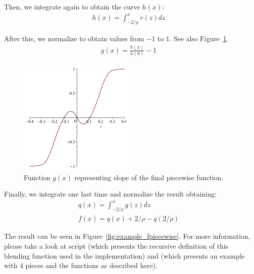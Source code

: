 \documentclass[11pt]{article}
\begin{document}
Then, we integrate again to obtain the curve $h(x)$:
\begin{align*}
  h(x) = \int_{-2/\rho}^{x} r(z) dz
\end{align*}

After this, we normalize to obtain values from $-1$ to $1$. See also Figure~\ref{fig:piecewise_slope}.
\begin{align*}
  g(x) = \frac{h(x)}{h(0)} - 1
\end{align*}

  \begin{figure}[!hbt]
    \begin{center}
      \includegraphics[width=0.5\textwidth]{piecewise_slope}
    \end{center}
    \caption{Function $g(x)$ representing slope of the final piecewise function.}
    \label{fig:piecewise_slope}
  \end{figure}

Finally, we integrate one last time and normalize the result obtaining:
\begin{align*}
  q(x) = \int_{-2/\rho}^{x} g(z) dz\\
  f(x) = q(x) + 2/\rho - q(2/\rho)
\end{align*}

The result can be seen in Figure~\ref{fig:example_fpiecewise}. For more information, please take a look at script  (which presents the recursive definition of this blending function used in the implementation) and  (which presents an example with 4 pieces and the functions as described here).
\end{document}
